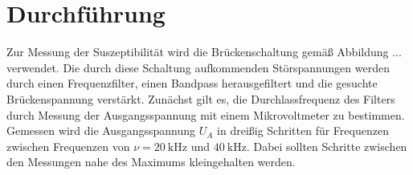 \section{Durchführung}
\label{sec:Durchführung}

Zur Messung der Suszeptibilität wird die Brückenschaltung
gemäß Abbildung ... verwendet. Die durch diese Schaltung
aufkommenden Störspannungen werden durch einen Frequenzfilter,
einen Bandpass herausgefiltert und die gesuchte
Brückenspannung verstärkt. Zunächst gilt es,
die Durchlassfrequenz des Filters durch Messung der
Ausgangsspannung mit einem Mikrovoltmeter zu bestimmen.
Gemessen wird die Ausgangsspannung $U_A$ in dreißig Schritten
für Frequenzen zwischen Frequenzen von $\nu = \SI{20}{\kilo\hertz}$ und
$\SI{40}{\kilo\hertz}$. Dabei sollten Schritte zwischen den Messungen
nahe des Maximums kleingehalten werden.


